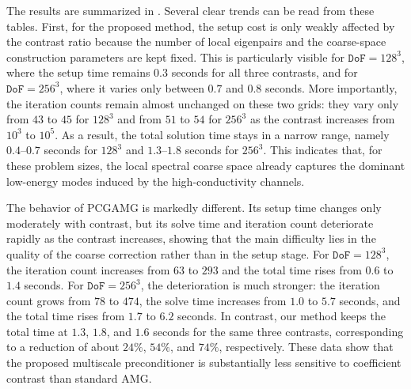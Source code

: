 \documentclass[preprint,12pt]{elsarticle}
\begin{document}
  The results are summarized in
  .
  Several clear trends can be read from these tables. First, for the proposed method,
  the setup cost is only weakly affected by the contrast ratio because the
  number of local eigenpairs and the coarse-space construction parameters are
  kept fixed. This is particularly visible for $\mathtt{DoF}=128^{3}$, where the
  setup time remains $0.3$ seconds for all three contrasts, and for $\mathtt{DoF}
  =256^{3}$, where it varies only between $0.7$ and $0.8$ seconds. More importantly,
  the iteration counts remain almost unchanged on these two grids: they vary only
  from $43$ to $45$ for $128^{3}$ and from $51$ to $54$ for $256^{3}$ as the contrast
  increases from $10^{3}$ to $10^{5}$. As a result, the total solution time stays
  in a narrow range, namely $0.4$--$0.7$ seconds for $128^{3}$ and $1.3$--$1.8$
  seconds for $256^{3}$. This indicates that, for these problem sizes, the local
  spectral coarse space already captures the dominant low-energy modes induced by
  the high-conductivity channels.

  The behavior of PCGAMG is markedly different. Its setup time changes only
  moderately with contrast, but its solve time and iteration count deteriorate rapidly
  as the contrast increases, showing that the main difficulty lies in the
  quality of the coarse correction rather than in the setup stage. For $\mathtt{DoF}
  =128^{3}$, the iteration count increases from $63$ to $293$ and the total time
  rises from $0.6$ to $1.4$ seconds. For $\mathtt{DoF}=256^{3}$, the
  deterioration is much stronger: the iteration count grows from $78$ to $474$,
  the solve time increases from $1.0$ to $5.7$ seconds, and the total time rises
  from $1.7$ to $6.2$ seconds. In contrast, our method keeps the total time at $1
  .3$, $1.8$, and $1.6$ seconds for the same three contrasts, corresponding to a
  reduction of about $24\%$, $54\%$, and $74\%$, respectively. These data show
  that the proposed multiscale preconditioner is substantially less sensitive to
  coefficient contrast than standard AMG.
\end{document}
